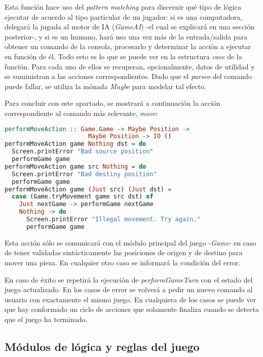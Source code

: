 \documentclass{llncs}
\begin{document}
Esta función hace uso del \textit{pattern matching} para discernir qué tipo de lógica ejecutar de acuerdo al tipo particular de un jugador: si es una computadora, delegará la jugada al motor de IA (\textit{GameAI}) -el cual se explicará en una sección posterior-, y si es un humano, hará uso una vez más de la entrada/salida para obtener un comando de la consola, procesarlo y determinar la acción a ejecutar en función de él. Todo esto es lo que se puede ver en la estructura \textit{case} de la función. Para cada uno de ellos se recuperan, opcionalmente, datos de utilidad y se suministran a las acciones correspondientes. Dado que el \textit{parseo} del comando puede fallar, se utiliza la mónada \textit{Maybe} para modelar tal efecto.

Para concluir con este apartado, se mostrará a continuación la acción correspondiente al comando más relevante, \textit{move}:

\begin{lstlisting}[frame=single, language=haskell, captionpos=b, caption=Función performMoveAction asociada al comando move, label={lst:perform_move_action}]
performMoveAction :: Game.Game -> Maybe Position ->
                       Maybe Position -> IO ()
performMoveAction game Nothing dst = do
  Screen.printError "Bad source position"
  performGame game
performMoveAction game src Nothing = do
  Screen.printError "Bad destiny position"
  performGame game
performMoveAction game (Just src) (Just dst) =
  case (Game.tryMovement game src dst) of
    Just nextGame -> performGame nextGame
    Nothing -> do
      Screen.printError "Illegal movement. Try again."
      performGame game
\end{lstlisting}

Esta acción sólo se comunicará con el módulo principal del juego -\textit{Game}- en caso de tener validadas sintácticamente las posiciones de origen y de destino para mover una pieza. En cualquier otro caso se informará la condición del error.

En caso de éxito se repetirá la ejecución de \textit{performGameTurn} con el estado del juego actualizado. En los casos de error se volverá a pedir un nuevo comando al usuario con exactamente el mismo juego. En cualquiera de los casos se puede ver que hay conformado un ciclo de acciones que solamente finaliza cuando se detecta que el juego ha terminado.


\subsection{Módulos de lógica y reglas del juego}
\end{document}
